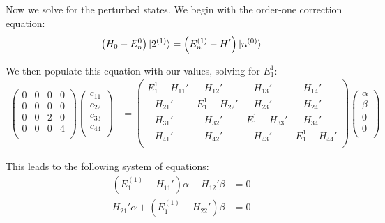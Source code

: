 \documentclass[10pt]{article} %
\begin{document}
Now we solve for the perturbed states. We begin with the order-one correction equation:\\

\begin{align*}
  \left(H_0 - E_n^0\right)\ket{2^{(1)}} &= \left(E_n^{(1)} - H'\right)\ket{n^{(0)}}\\
\end{align*}

We then populate this equation with our values, solving for $E_1^1$:\\

\begin{align*}
  \begin{pmatrix}
    0 & 0 & 0 & 0\\
    0 & 0 & 0 & 0\\
    0 & 0 & 2 & 0\\
    0 & 0 & 0 & 4\\
  \end{pmatrix}
  \begin{pmatrix}
    c_{11}\\
    c_{22}\\
    c_{33}\\
    c_{44}\\
  \end{pmatrix}
  &=
  \begin{pmatrix}
    E_1^1 - H_{11}' & -H_{12}' & -H_{13}' & -H_{14}'\\
    -H_{21}' & E_1^1 - H_{22}' & -H_{23}' & -H_{24}'\\
    -H_{31}' & -H_{32}' & E_1^1 - H_{33}' & -H_{34}'\\
    -H_{41}' & -H_{42}' & -H_{43}' & E_1^1 - H_{44}'\\
  \end{pmatrix}
  \begin{pmatrix}
    \alpha\\
    \beta\\
    0\\
    0\\
  \end{pmatrix}
\end{align*}

This leads to the following system of equations:\\

\begin{align*}
  \left(E_1^{(1)} - H_{11}'\right)\alpha + H_{12}'\beta &= 0\\
  H_{21}'\alpha + \left(E_1^{(1)} - H_{22}'\right)\beta &= 0\\
\end{align*}
\end{document}
